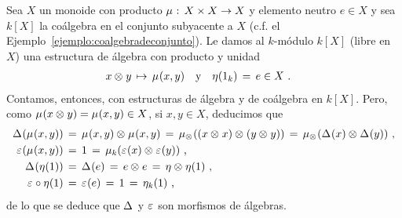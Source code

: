 \begin{ejemploBialgebra}\label{ejemplo:bialgebramonoide}
	Sea $X$ un monoide con producto $\producto:\,X\times X\rightarrow X$ y
	elemento neutro $e\in X$ y sea $k[X]$ la co\'{a}lgebra en el conjunto
	subyacente a $X$ (c.f. el Ejemplo~\ref{ejemplo:coalgebradeconjunto}).
	Le damos al $k$-m\'{o}dulo $k[X]$ (libre en $X$) una estructura de
	\'{a}lgebra con producto y unidad
	\begin{align*}
		x\tensor y\,\mapsto\,\producto(x,y) & \quad\text{y}\quad
			\unidad(1_k) \,=\,e\in X
		\text{ .}
	\end{align*}
	Contamos, entonces, con estructuras de \'{a}lgebra y de co\'{a}lgebra
	en $k[X]$. Pero, como $\producto(x\tensor y)=\producto(x,y)\in X$, si
	$x,y\in X$, deducimos que
	\begin{align*}
		\coproducto(\producto(x,y)) & \,=\,
			\producto(x,y)\tensor\producto(x,y) \,=\,
			\producto[\tensor]((x\tensor x)\tensor (y\tensor y))
				\,=\,
			\producto[\tensor](\coproducto(x)\tensor\coproducto(y))
				\text{ ,} \\
		\counidad(\producto(x,y)) & \,=\,1\,=\,
			\producto[k](\counidad(x)\tensor\counidad(y))
				\text{ ,} \\
		\coproducto(\unidad(1)) & \,=\,\coproducto(e)\,=\,e\tensor e
			\,=\,\unidad\tensor\unidad(1) \text{ ,} \\
		\counidad\circ\unidad(1) & \,=\,\counidad(e) \,=\,1 \,=\,
			\unidad[k](1)
		\text{ ,}
	\end{align*}
	de lo que se deduce que $\coproducto$ y $\counidad$ son morfismos de
	\'{a}lgebras.
\end{ejemploBialgebra}

